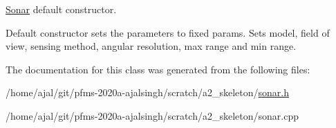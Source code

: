 \hyperlink{classSonar}{Sonar} default constructor. 

Default constructor sets the parameters to fixed params. Sets model, field of view, sensing method, angular resolution, max range and min range. 

The documentation for this class was generated from the following files\+:\begin{DoxyCompactItemize}
\item 
/home/ajal/git/pfms-\/2020a-\/ajalsingh/scratch/a2\+\_\+skeleton/\hyperlink{sonar_8h}{sonar.\+h}\item 
/home/ajal/git/pfms-\/2020a-\/ajalsingh/scratch/a2\+\_\+skeleton/sonar.\+cpp\end{DoxyCompactItemize}
